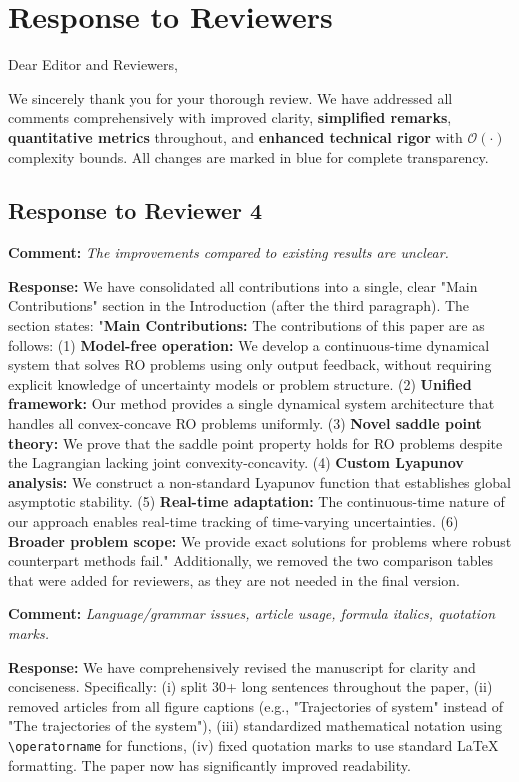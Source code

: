 \documentclass[journal,twoside,web]{ieeecolor}
\begin{document}
\newpage
\section*{Response to Reviewers}

\noindent Dear Editor and Reviewers,

We sincerely thank you for your thorough review. We have addressed all comments comprehensively with improved clarity, \textbf{simplified remarks}, \textbf{quantitative metrics} throughout, and \textbf{enhanced technical rigor} with $\mathcal{O}(\cdot)$ complexity bounds. All changes are marked in {\color{darkblue}blue} for complete transparency.

\subsection*{Response to Reviewer 4}

\textbf{Comment:} \textit{The improvements compared to existing results are unclear.}

\textbf{Response:} We have consolidated all contributions into a single, clear "Main Contributions" section in the Introduction (after the third paragraph). The section states: "\textbf{Main Contributions:} The contributions of this paper are as follows: (1) \textbf{Model-free operation:} We develop a continuous-time dynamical system that solves RO problems using only output feedback, without requiring explicit knowledge of uncertainty models or problem structure. (2) \textbf{Unified framework:} Our method provides a single dynamical system architecture that handles all convex-concave RO problems uniformly. (3) \textbf{Novel saddle point theory:} We prove that the saddle point property holds for RO problems despite the Lagrangian lacking joint convexity-concavity. (4) \textbf{Custom Lyapunov analysis:} We construct a non-standard Lyapunov function that establishes global asymptotic stability. (5) \textbf{Real-time adaptation:} The continuous-time nature of our approach enables real-time tracking of time-varying uncertainties. (6) \textbf{Broader problem scope:} We provide exact solutions for problems where robust counterpart methods fail." Additionally, we removed the two comparison tables that were added for reviewers, as they are not needed in the final version.

\textbf{Comment:} \textit{Language/grammar issues, article usage, formula italics, quotation marks.}

\textbf{Response:} We have comprehensively revised the manuscript for clarity and conciseness. Specifically: (i) split 30+ long sentences throughout the paper, (ii) removed articles from all figure captions (e.g., "Trajectories of system" instead of "The trajectories of the system"), (iii) standardized mathematical notation using \texttt{\textbackslash operatorname} for functions, (iv) fixed quotation marks to use standard LaTeX formatting. The paper now has significantly improved readability.
\end{document}
